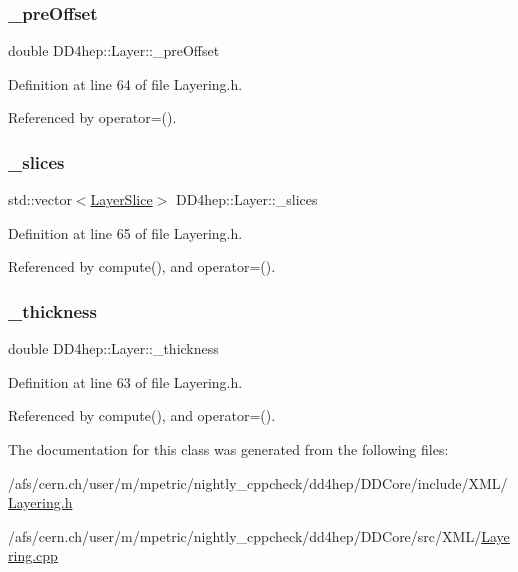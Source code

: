 \subsubsection{\texorpdfstring{\+\_\+pre\+Offset}{\_preOffset}}
{\footnotesize\ttfamily double D\+D4hep\+::\+Layer\+::\+\_\+pre\+Offset}



Definition at line 64 of file Layering.\+h.



Referenced by operator=().

\hypertarget{class_d_d4hep_1_1_layer_a45011afeb7fafcefe3de7275a50e5aaf}{}\label{class_d_d4hep_1_1_layer_a45011afeb7fafcefe3de7275a50e5aaf} 
\subsubsection{\texorpdfstring{\+\_\+slices}{\_slices}}
{\footnotesize\ttfamily std\+::vector$<$\hyperlink{class_d_d4hep_1_1_layer_slice}{Layer\+Slice}$>$ D\+D4hep\+::\+Layer\+::\+\_\+slices}



Definition at line 65 of file Layering.\+h.



Referenced by compute(), and operator=().

\hypertarget{class_d_d4hep_1_1_layer_afe2f78c9d1a66a6956deded6c4f7a7e1}{}\label{class_d_d4hep_1_1_layer_afe2f78c9d1a66a6956deded6c4f7a7e1} 
\subsubsection{\texorpdfstring{\+\_\+thickness}{\_thickness}}
{\footnotesize\ttfamily double D\+D4hep\+::\+Layer\+::\+\_\+thickness}



Definition at line 63 of file Layering.\+h.



Referenced by compute(), and operator=().



The documentation for this class was generated from the following files\+:\begin{DoxyCompactItemize}
\item 
/afs/cern.\+ch/user/m/mpetric/nightly\+\_\+cppcheck/dd4hep/\+D\+D\+Core/include/\+X\+M\+L/\hyperlink{_layering_8h}{Layering.\+h}\item 
/afs/cern.\+ch/user/m/mpetric/nightly\+\_\+cppcheck/dd4hep/\+D\+D\+Core/src/\+X\+M\+L/\hyperlink{_layering_8cpp}{Layering.\+cpp}\end{DoxyCompactItemize}
